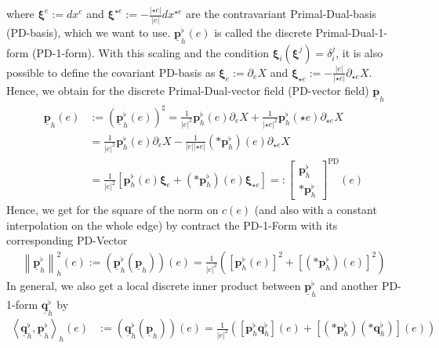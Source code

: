 \documentclass[a4paper,11pt]{scrartcl}
\newcommand{\pflh}{\mathbf{p}^{\flat}_{h}}
\newcommand{\qflh}{\mathbf{q}^{\flat}_{h}}
\newcommand{\PDpflh}{\underline{\mathbf{p}}^{\flat}_{h}}
\newcommand{\PDqflh}{\underline{\mathbf{q}}^{\flat}_{h}}
\newcommand{\PDph}{\underline{\mathbf{p}}_{h}}
\newcommand{\PDxi}{\boldsymbol{\xi}}
\begin{document}
    where \( \PDxi^{e}:=dx^{e} \) and \( \PDxi^{\star e}:= - \frac{\left| \star e \right|}{\left| e \right|}dx^{\star e}\) are the
    contravariant Primal-Dual-basis (PD-basis), which we want to use.
    \( \PDpflh(e) \) is called the discrete Primal-Dual-1-form (PD-1-form).
    With this scaling and the condition \( \PDxi_{i}(\PDxi^{j}) = \delta^{j}_{i} \), 
    it is also possible to define the covariant PD-basis as 
    \( \PDxi_{e}:=\partial_{e}X \) and \( \PDxi_{\star e}:= -\frac{\left| e \right|}{\left| \star e \right|}\partial_{\star e}X \).
    Hence, we obtain for the discrete Primal-Dual-vector field (PD-vector field) \( \PDph \)
    \begin{align}
      \PDph(e) &:= \left(\PDpflh(e)\right)^{\sharp} 
                 = \frac{1}{\left| e \right|^{2}} \pflh(e)\partial_{e}X + \frac{1}{\left|\star e \right|^{2}} \pflh(\star e)\partial_{\star e}X \\
               &= \frac{1}{\left| e \right|^{2}} \pflh(e)\partial_{e}X 
                   -\frac{1}{\left| e \right|\left|\star e \right|} \left(*\pflh\right)(e) \partial_{\star e}X \\
               &= \frac{1}{\left| e \right|^{2}}\left[ \pflh(e)\PDxi_{e} + \left(*\pflh\right)(e)\PDxi_{\star e} \right]
               =: \begin{bmatrix}
                     \pflh \\ *\pflh 
                   \end{bmatrix}^{\text{PD}} (e)
    \end{align}
    Hence, we get for the square of the norm on \( c(e) \) 
    (and also with a constant interpolation on the whole edge) by contract the PD-1-Form with its corresponding PD-Vector
    \begin{align} \label{eqPDNorm}
      \left\| \PDpflh \right\|_{h}^{2}(e) := \left( \PDpflh\left( \PDph \right) \right)(e)
                                       = \frac{1}{\left| e \right|^{2}}\left( \left[ \pflh(e) \right]^{2} 
                                                                             +\left[ \left(*\pflh\right)(e) \right]^{2}\right)
    \end{align}
    In general, we also get a local discrete inner product between \( \PDpflh \) and another PD-1-form \( \PDqflh \) by
    \begin{align}
      \left\langle \PDqflh , \PDpflh \right\rangle_{h}(e)
          &:= \left( \PDqflh\left( \PDph \right) \right)(e)
                                       = \frac{1}{\left| e \right|^{2}}\left( \left[\pflh\qflh\right](e) 
                                                                             +\left[\left(*\pflh\right)\left(*\qflh\right)\right](e) \right)
    \end{align}
\end{document}
